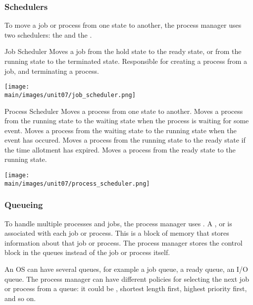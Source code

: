 \documentclass[\main/notes.tex]{subfiles}
\begin{document}
				\subsubsection{Schedulers}
					To move a job or process from one state to another, the process manager uses two schedulers: the  and the .
					\begin{definition}{Job Scheduler}
						Moves a job from the hold state to the ready state, or from the running state to the terminated state. Responsible for creating a process from a job, and terminating a process.
						\begin{center}
							\texttt{[image: \\main/images/unit07/job\_scheduler.png]}
						\end{center}
					\end{definition}
					\begin{definition}{Process Scheduler}
						Moves a process from one state to another. Moves a process from the running state to the waiting state when the process is waiting for some event. Moves a process from the waiting state to the running state when the event has occured. Moves a process from the running state to the ready state if the time allotment has expired. Moves a process from the ready state to the running state.
						\begin{center}
							\texttt{[image: \\main/images/unit07/process\_scheduler.png]}
						\end{center}
					\end{definition}

				\subsubsection{Queueing}
					To handle multiple processes and jobs, the process manager uses . A , or  is associated with each job or process. This is a block of memory that stores information about that job or process. The process manager stores the control block in the queues instead of the job or process itself.

					An OS can have several queues, for example a job queue, a ready queue, an I/O queue. The process manager can have different policies for selecting the next job or process from a queue: it could be , shortest length first, highest priority first, and so on.
\end{document}

